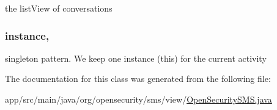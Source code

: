 the list\+View of conversations \hypertarget{a00010_abb0d0e377de688c5417fcaf531612a23}{
\subsubsection[{instance}]{ instance\hspace{0.3cm}{\ttfamily [static]}, {\ttfamily [private]}}}\label{a00010_abb0d0e377de688c5417fcaf531612a23}
singleton pattern. We keep one instance (this) for the current activity 

The documentation for this class was generated from the following file\+:\begin{DoxyCompactItemize}
\item 
app/src/main/java/org/opensecurity/sms/view/\hyperlink{a00029}{Open\+Security\+S\+M\+S.\+java}\end{DoxyCompactItemize}
